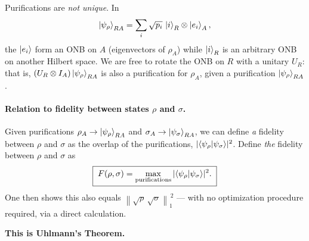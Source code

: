 \documentclass[11pt]{article}
\newcommand{\onenorm}[1]{\left\lVert #1 \right\rVert_{1}}
\begin{document}
Purifications are \emph{not unique}. In
\[
\ket{\psi_\rho}_{RA} = \sum_i \sqrt{p_i}\,\ket{i}_R \otimes \ket{e_i}_A,
\]
the $\ket{e_i}$ form an ONB on $A$ (eigenvectors of $\rho_A$) while $\ket{i}_R$
is an arbitrary ONB on another Hilbert space. We are free to rotate the ONB on
$R$ with a unitary $U_R$: that is, $(U_R\otimes I_A)\ket{\psi_\rho}_{RA}$ is
also a purification for $\rho_A$, given a purification $\ket{\psi_\rho}_{RA}$.

\paragraph{Relation to fidelity between states $\rho$ and $\sigma$.}
Given purifications $\rho_A\to\ket{\psi_\rho}_{RA}$ and
$\sigma_A\to\ket{\psi_\sigma}_{RA}$, we can define \emph{a} fidelity between
$\rho$ and $\sigma$ as the overlap of the purifications,
$|\!\braket{\psi_\rho|\psi_\sigma}\!|^{2}$. Define \emph{the} fidelity between
$\rho$ and $\sigma$ as
\[
\boxed{\;
F(\rho,\sigma) = \max_{\text{purifications}}
|\!\braket{\psi_\rho|\psi_\sigma}\!|^{2}.
\;}
\]
One then shows this also equals $\onenorm{\sqrt{\rho}\,\sqrt{\sigma}}^{\,2}$ ---
with no optimization procedure required, via a direct calculation.

\medskip
\noindent\textbf{This is Uhlmann's Theorem.}
\end{document}
